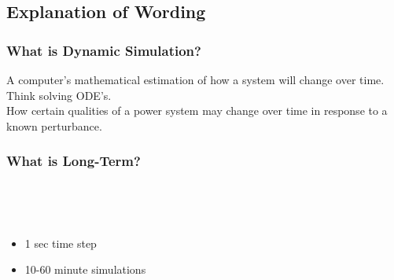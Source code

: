 \documentclass[14pt, unknownkeysallowed]{beamer}
\begin{document}
\subsection{Explanation of Wording}
\begin{frame}
\frametitle{What is Dynamic Simulation?}
A computer's mathematical estimation of how a system will change over time.\\%
\vspace{1em}
Think solving ODE's.\\
\vspace{1em}
How certain qualities of a power system may change over time in response to a known perturbance.
\end{frame}
\begin{frame}
\frametitle{What is Long-Term?}\ \vspace{-1em}
\begin{multicols}{2}
\cite{SauerPaiChow}  \\
\begin{itemize}
\item 1 sec time step
\item 10-60 minute simulations
\end{itemize}
\end{multicols}

\end{frame}
\end{document}
